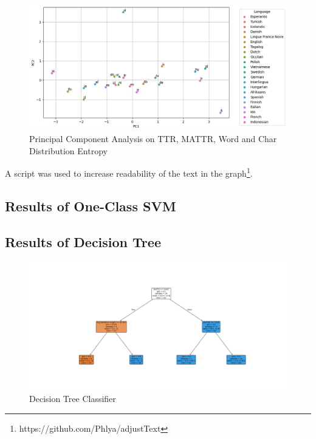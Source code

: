 \documentclass[12pt,a4paper]{article}
\numberwithin{figure}{section}
\numberwithin{table}{section}
\numberwithin{definition}{section}
\begin{document}
\begin{figure}
  \centering
        \includegraphics[width=1.0\textwidth]{pcaanalysis.png}
        \caption{Principal Component Analysis on TTR, MATTR, Word and Char Distribution Entropy}
        \label{fig:pcaanalysis}
\end{figure}


A script was used to increase readability of the text in the graph\footnote{https://github.com/Phlya/adjustText}.

\subsection{Results of One-Class SVM}
\label{ssec:oneclasssvmresults}

\subsection{Results of Decision Tree}
\label{ssec:decisiontreeresults}

\begin{figure}
  \centering
        \includegraphics[width=1.0\textwidth]{decisiontree.png}
        \caption{Decision Tree Classifier}
        \label{fig:decisiontree}
\end{figure}
\end{document}
